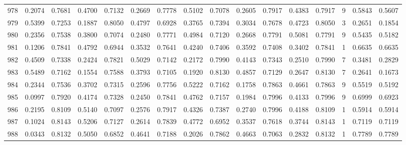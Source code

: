\begin{tabular}{lrrrrrrrrrrrrrrr}
978 &      0.2074 &  0.7681 &  0.4700 &  0.7132 &  0.2669 &  0.7778 &  0.5102 &  0.7078 &  0.2605 &  0.7917 &   0.4383 &     0.7917 &      9 &                    0.5843 &                     0.5607 \\
979 &      0.5399 &  0.7253 &  0.1887 &  0.8050 &  0.4797 &  0.6928 &  0.3765 &  0.7394 &  0.3034 &  0.7678 &   0.4723 &     0.8050 &      3 &                    0.2651 &                     0.1854 \\
980 &      0.2356 &  0.7538 &  0.3800 &  0.7074 &  0.2480 &  0.7771 &  0.4984 &  0.7120 &  0.2668 &  0.7791 &   0.5081 &     0.7791 &      9 &                    0.5435 &                     0.5182 \\
981 &      0.1206 &  0.7841 &  0.4792 &  0.6944 &  0.3532 &  0.7641 &  0.4240 &  0.7406 &  0.3592 &  0.7408 &   0.3402 &     0.7841 &      1 &                    0.6635 &                     0.6635 \\
982 &      0.4509 &  0.7338 &  0.2424 &  0.7821 &  0.5029 &  0.7142 &  0.2172 &  0.7990 &  0.4143 &  0.7343 &   0.2510 &     0.7990 &      7 &                    0.3481 &                     0.2829 \\
983 &      0.5489 &  0.7162 &  0.1554 &  0.7588 &  0.3793 &  0.7105 &  0.1920 &  0.8130 &  0.4857 &  0.7129 &   0.2647 &     0.8130 &      7 &                    0.2641 &                     0.1673 \\
984 &      0.2344 &  0.7536 &  0.3702 &  0.7315 &  0.2596 &  0.7756 &  0.5222 &  0.7162 &  0.1758 &  0.7863 &   0.4661 &     0.7863 &      9 &                    0.5519 &                     0.5192 \\
985 &      0.0997 &  0.7920 &  0.4174 &  0.7328 &  0.2450 &  0.7841 &  0.4762 &  0.7157 &  0.1984 &  0.7996 &   0.4133 &     0.7996 &      9 &                    0.6999 &                     0.6923 \\
986 &      0.2195 &  0.8109 &  0.5140 &  0.7097 &  0.2576 &  0.7917 &  0.4326 &  0.7387 &  0.2740 &  0.7996 &   0.4188 &     0.8109 &      1 &                    0.5914 &                     0.5914 \\
987 &      0.1024 &  0.8143 &  0.5206 &  0.7127 &  0.2614 &  0.7839 &  0.4772 &  0.6952 &  0.3537 &  0.7618 &   0.3744 &     0.8143 &      1 &                    0.7119 &                     0.7119 \\
988 &      0.0343 &  0.8132 &  0.5050 &  0.6852 &  0.4641 &  0.7188 &  0.2026 &  0.7862 &  0.4663 &  0.7063 &   0.2832 &     0.8132 &      1 &                    0.7789 &                     0.7789 \\

\end{tabular}
